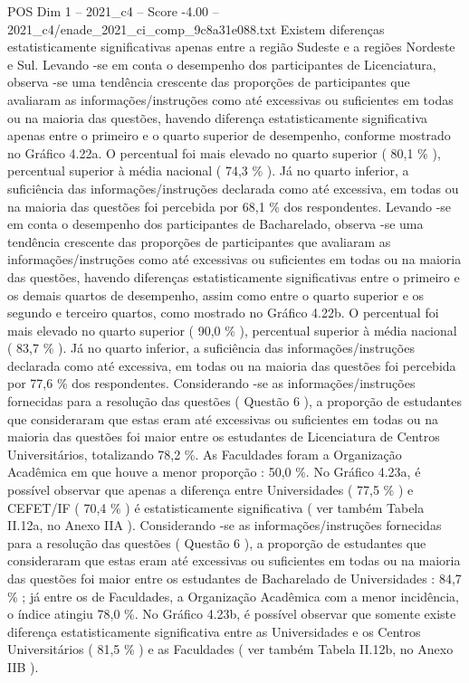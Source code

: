 \begin{textsample}{POS Dim 1 – 2021\_c4 – Score -4.00 – 2021\_c4/enade\_2021\_ci\_comp\_9c8a31e088.txt}
Existem diferenças estatisticamente significativas apenas entre a região Sudeste e a regiões Nordeste e Sul.
Levando -se em conta o desempenho dos participantes de Licenciatura, observa -se uma tendência crescente das proporções de participantes que avaliaram as informações/instruções como até excessivas ou suficientes em todas ou na maioria das questões, havendo diferença estatisticamente significativa apenas entre o primeiro e o quarto superior de desempenho, conforme mostrado no Gráfico 4.22a.
O percentual foi mais elevado no quarto superior ( 80,1 \% ), percentual superior à média nacional ( 74,3 \% ).
Já no quarto inferior, a suficiência das informações/instruções declarada como até excessiva, em todas ou na maioria das questões foi percebida por 68,1 \% dos respondentes.
Levando -se em conta o desempenho dos participantes de Bacharelado, observa -se uma tendência crescente das proporções de participantes que avaliaram as informações/instruções como até excessivas ou suficientes em todas ou na maioria das questões, havendo diferenças estatisticamente significativas entre o primeiro e os demais quartos de desempenho, assim como entre o quarto superior e os segundo e terceiro quartos, como mostrado no Gráfico 4.22b.
O percentual foi mais elevado no quarto superior ( 90,0 \% ), percentual superior à média nacional ( 83,7 \% ).
Já no quarto inferior, a suficiência das informações/instruções declarada como até excessiva, em todas ou na maioria das questões foi percebida por 77,6 \% dos respondentes.
Considerando -se as informações/instruções fornecidas para a resolução das questões ( Questão 6 ), a proporção de estudantes que consideraram que estas eram até excessivas ou suficientes em todas ou na maioria das questões foi maior entre os estudantes de Licenciatura de Centros Universitários, totalizando 78,2 \%.
As Faculdades foram a Organização Acadêmica em que houve a menor proporção : 50,0 \%.
No Gráfico 4.23a, é possível observar que apenas a diferença entre Universidades ( 77,5 \% ) e CEFET/IF ( 70,4 \% ) é estatisticamente significativa ( ver também Tabela II.12a, no Anexo IIA ).
Considerando -se as informações/instruções fornecidas para a resolução das questões ( Questão 6 ), a proporção de estudantes que consideraram que estas eram até excessivas ou suficientes em todas ou na maioria das questões foi maior entre os estudantes de Bacharelado de Universidades : 84,7 \% ; já entre os de Faculdades, a Organização Acadêmica com a menor incidência, o índice atingiu 78,0 \%.
No Gráfico 4.23b, é possível observar que somente existe diferença estatisticamente significativa entre as Universidades e os Centros Universitários ( 81,5 \% ) e as Faculdades ( ver também Tabela II.12b, no Anexo IIB ).

\end{textsample}
